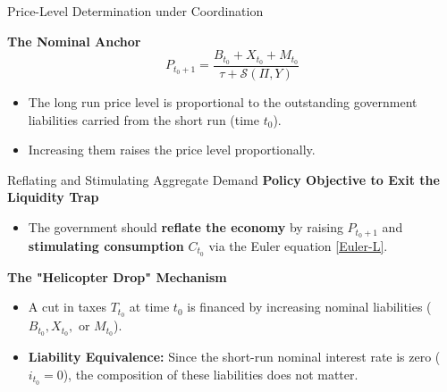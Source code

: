 \documentclass[11pt,aspectratio=169]{beamer}
\begin{document}
\begin{frame}{Price-Level Determination under Coordination}
\small

\textbf{The Nominal Anchor}
\begin{equation}
    P_{t_0+1} = \frac{B_{t_0}+X_{t_0}+M_{t_0}}{\tau + \mathcal{S}(\Pi,Y)} \label{Plong}
\end{equation}
\vspace{0.3cm}
\begin{itemize}
    \item The long run price level is proportional to the outstanding government liabilities carried from the short run (time $t_0$).
    \item Increasing them raises the price level proportionally.
\end{itemize}
\end{frame}
\begin{frame}{Reflating and Stimulating Aggregate Demand}
\small
\textbf{Policy Objective to Exit the Liquidity Trap}
\begin{itemize}
    \item The government should \textbf{reflate the economy} by raising $P_{t_0+1}$ and \textbf{stimulating consumption} $C_{t_0}$ via the Euler equation \eqref{Euler-L}.
\end{itemize}

\vspace{0.3cm}

\textbf{The "Helicopter Drop" Mechanism}
\begin{itemize}
    \item A cut in taxes $T_{t_0}$ at time $t_0$ is financed by increasing nominal liabilities ($B_{t_0}, X_{t_0}, \text{ or } M_{t_0}$). 
    \item \textbf{Liability Equivalence:} Since the short-run nominal interest rate is zero ($i_{t_0}=0$), the composition of these liabilities does not matter.
\end{itemize}
\end{frame}
\end{document}
